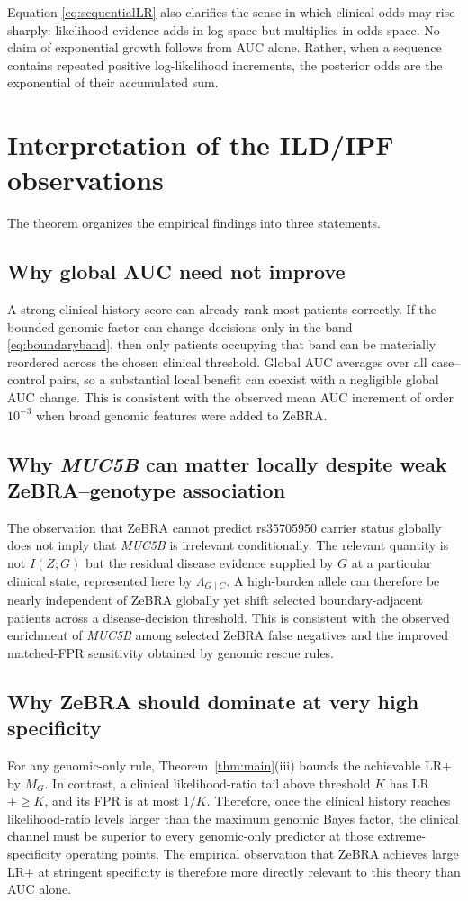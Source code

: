\documentclass[journal]{IEEEtran}
\newcommand{\LR}{\Lambda}
\begin{document}
Equation \eqref{eq:sequentialLR} also clarifies the sense in which clinical odds may rise sharply: likelihood evidence adds in log space but multiplies in odds space. No claim of exponential growth follows from AUC alone. Rather, when a sequence contains repeated positive log-likelihood increments, the posterior odds are the exponential of their accumulated sum.

\section{Interpretation of the ILD/IPF observations}

The theorem organizes the empirical findings into three statements.

\subsection{Why global AUC need not improve}
A strong clinical-history score can already rank most patients correctly. If the bounded genomic factor can change decisions only in the band \eqref{eq:boundaryband}, then only patients occupying that band can be materially reordered across the chosen clinical threshold. Global AUC averages over all case--control pairs, so a substantial local benefit can coexist with a negligible global AUC change. This is consistent with the observed mean AUC increment of order $10^{-3}$ when broad genomic features were added to ZeBRA.

\subsection{Why \textit{MUC5B} can matter locally despite weak ZeBRA--genotype association}
The observation that ZeBRA cannot predict rs35705950 carrier status globally does not imply that \textit{MUC5B} is irrelevant conditionally. The relevant quantity is not $I(Z;G)$ but the residual disease evidence supplied by $G$ at a particular clinical state, represented here by $\LR_{G\mid C}$. A high-burden allele can therefore be nearly independent of ZeBRA globally yet shift selected boundary-adjacent patients across a disease-decision threshold. This is consistent with the observed enrichment of \textit{MUC5B} among selected ZeBRA false negatives and the improved matched-FPR sensitivity obtained by genomic rescue rules.

\subsection{Why ZeBRA should dominate at very high specificity}
For any genomic-only rule, Theorem~\ref{thm:main}(iii) bounds the achievable LR$+$ by $M_G$. In contrast, a clinical likelihood-ratio tail above threshold $K$ has LR$+\ge K$, and its FPR is at most $1/K$. Therefore, once the clinical history reaches likelihood-ratio levels larger than the maximum genomic Bayes factor, the clinical channel must be superior to every genomic-only predictor at those extreme-specificity operating points. The empirical observation that ZeBRA achieves large LR$+$ at stringent specificity is therefore more directly relevant to this theory than AUC alone.
\end{document}
